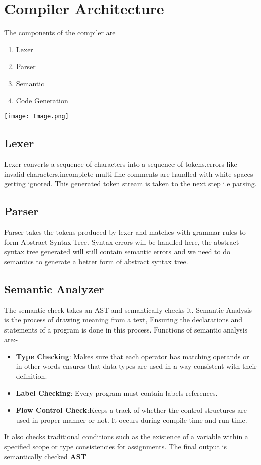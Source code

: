 \documentclass[english,a4paper,12pt]{report}
\begin{document}
\chapter{Compiler Architecture}
The components of the compiler are
\begin{enumerate}
    \item Lexer
    \item Parser
    \item Semantic
    \item Code Generation
\end{enumerate}
    \texttt{[image: Image.png]}
    \section{Lexer}
    Lexer converts a sequence of characters into a sequence of tokens.errors like invalid characters,incomplete multi line comments are handled with white spaces getting ignored. This generated token stream is taken to the next step i.e parsing.
    \section{Parser}
    Parser takes the tokens produced by lexer and matches with grammar rules to form Abstract Syntax Tree. Syntax errors will be handled here, the abstract syntax tree generated will still contain semantic errors and we need to do semantics to generate a better form of abstract syntax tree.
    \section{Semantic Analyzer}
    The semantic check takes an AST and semantically checks it. Semantic Analysis is the process of drawing meaning from a text, Ensuring the declarations and statements of a program is done in this process. Functions of semantic analysis are:-
    \begin{itemize}
        \item \textbf{Type Checking}: Makes sure that each operator has matching operands or in other words ensures that data types are used in a way consistent with their definition.
        \item \textbf{Label Checking}: Every program must contain labels references.
        \item \textbf{Flow Control Check}:Keeps a track of whether the control structures are used in proper manner or not. It occurs during compile time and run time.
    \end{itemize}
    It also checks traditional conditions such as the existence of a variable within a specified scope or type consistencies for assignments. The final output is semantically checked \textbf{AST}
\end{document}
